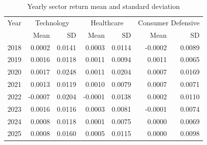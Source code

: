 \begin{table}[htbp]
\centering
\begin{tabular}{lrr|rr|rr}
\hline
Year & \multicolumn{2}{c|}{Technology} & \multicolumn{2}{c|}{Healthcare} & \multicolumn{2}{c}{Consumer Defensive} \\
 & Mean & SD & Mean & SD & Mean & SD \\
\hline
2018 & 0.0002 & 0.0141 & 0.0003 & 0.0114 & -0.0002 & 0.0089 \\
2019 & 0.0016 & 0.0118 & 0.0011 & 0.0094 & 0.0011 & 0.0065 \\
2020 & 0.0017 & 0.0248 & 0.0011 & 0.0204 & 0.0007 & 0.0169 \\
2021 & 0.0013 & 0.0119 & 0.0010 & 0.0079 & 0.0007 & 0.0071 \\
2022 & -0.0007 & 0.0204 & -0.0001 & 0.0138 & 0.0002 & 0.0110 \\
2023 & 0.0016 & 0.0116 & 0.0003 & 0.0081 & -0.0001 & 0.0074 \\
2024 & 0.0008 & 0.0118 & 0.0001 & 0.0075 & 0.0000 & 0.0069 \\
2025 & 0.0008 & 0.0160 & 0.0005 & 0.0115 & 0.0000 & 0.0098 \\
\hline
\end{tabular}
\caption{Yearly sector return mean and standard deviation}
\label{tab:sector_return}
\end{table}
